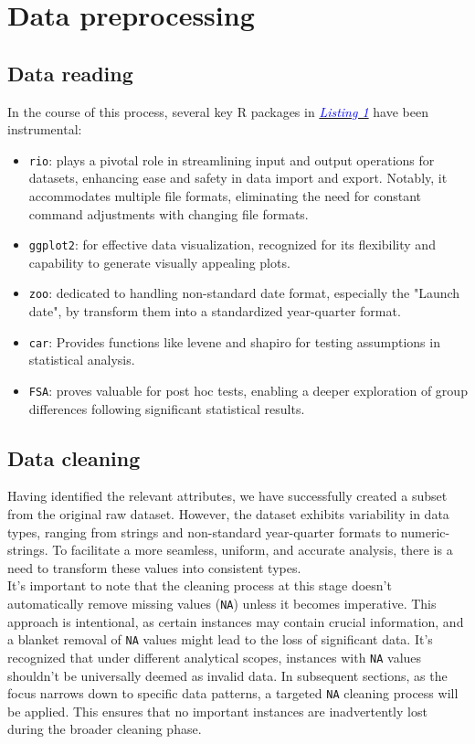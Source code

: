 \section{Data preprocessing}
\subsection{Data reading}
In the course of this process, several key R packages in \hyperlink{Listing 1}{\textit{\textcolor{blue}{Listing 1}}} have been instrumental:
\begin{itemize}
\item \verb|rio|: plays a pivotal role in streamlining input and output operations for datasets, enhancing ease and safety in data import and export. Notably, it accommodates multiple file formats, eliminating the need for constant command adjustments with changing file formats.
\item\verb|ggplot2|: for effective data visualization, recognized for its flexibility and capability to generate visually appealing plots.
\item\verb|zoo|: dedicated to handling non-standard date format, especially the "Launch date", by transform them into a standardized year-quarter format.
\item\verb|car|: Provides functions like levene and shapiro for testing assumptions in statistical analysis.
\item\verb|FSA|: proves valuable for post hoc tests, enabling a deeper exploration of group differences following significant statistical results.
\end{itemize}

\subsection{Data cleaning}
Having identified the relevant attributes, we have successfully created a subset from the original raw dataset. However, the dataset exhibits variability in data types, ranging from strings and non-standard year-quarter formats to numeric-strings. To facilitate a more seamless, uniform, and accurate analysis, there is a need to transform these values into consistent types.\\ 
 It's important to note that the cleaning process at this stage doesn't automatically remove missing values (\texttt{NA}) unless it becomes imperative. This approach is intentional, as certain instances may contain crucial information, and a blanket removal of \texttt{NA} values might lead to the loss of significant data. It's recognized that under different analytical scopes, instances with \texttt{NA} values shouldn't be universally deemed as invalid data. In subsequent sections, as the focus narrows down to specific data patterns, a targeted \texttt{NA} cleaning process will be applied. This ensures that no important instances are inadvertently lost during the broader cleaning phase. 